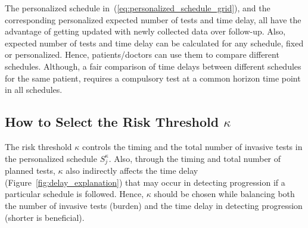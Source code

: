 The personalized schedule in~(\ref{eq:personalized_schedule_grid}), and the corresponding personalized expected number of tests and time delay, all have the advantage of getting updated with newly collected data over follow-up. Also, expected number of tests and time delay can be calculated for any schedule, fixed or personalized. Hence, patients/doctors can use them to compare different schedules. Although, a fair comparison of time delays between different schedules for the same patient, requires a compulsory test at a common horizon time point in all schedules.

\subsection{How to Select the Risk Threshold $\kappa$}
The risk threshold $\kappa$ controls the timing and the total number of invasive tests in the personalized schedule $S^\kappa_j$. Also, through the timing and total number of planned tests, $\kappa$ also indirectly affects the time delay (Figure~\ref{fig:delay_explanation}) that may occur in detecting progression if a particular schedule is followed. Hence, $\kappa$ should be chosen while balancing both the number of invasive tests (burden) and the time delay in detecting progression (shorter is beneficial).

